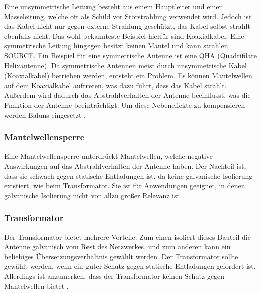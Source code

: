 Eine unsymmetrische Leitung besteht aus einem Hauptleiter und einer Masseleitung, welche oft als Schild vor Störstrahlung verwendet wird. Jedoch ist das Kabel nicht nur gegen externe Strahlung geschützt, das Kabel selbst strahlt ebenfalls nicht. Das wohl bekannteste Beispiel hierfür sind Koaxialkabel. Eine symmetrische Leitung hingegen besitzt keinen Mantel und kann strahlen SOURCE. Ein Beispiel für eine symmetrische Antenne ist eine QHA (Quadrifilare Helixantenne). Da symmetrische Antennen meist durch unsymmetrische Kabel (Koaxialkabel) betrieben werden, entsteht ein Problem. Es können Mantelwellen auf dem Koaxialkabel auftreten, was dazu führt, dass das Kabel strahlt. Außerdem wird dadurch das Abstrahlverhalten der Antenne beeinflusst, was die Funktion der Antenne beeinträchtigt. Um diese Nebeneffekte zu kompensieren werden Baluns eingesetzt \cite{balun}.

\subsubsection{Mantelwellensperre}
Eine Mantelwellensperre unterdrückt Mantelwellen, welche negative Auswirkungen auf das Abstrahlverhalten der Antenne haben. Der Nachteil ist, dass sie schwach gegen statische Entladungen ist, da keine galvanische Isolierung existiert, wie beim Transformator. Sie ist für Anwendungen geeignet, in denen galvanische Isolierung nicht von allzu großer Relevanz ist \cite{balun}.

\subsubsection{Transformator}
Der Transformator bietet mehrere Vorteile. Zum einen isoliert dieses Bauteil die Antenne galvanisch vom Rest des Netzwerkes, und zum anderen kann ein beliebiges Übersetzungsverhältnis gewählt werden. Der Transformator sollte gewählt werden, wenn ein guter Schutz gegen statische Entladungen gefordert ist. Allerdings ist anzumerken, dass der Transformator keinen Schutz gegen Mantelwellen bietet \cite{balun}.

